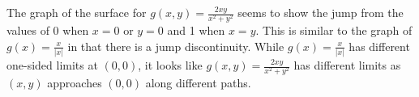 \begin{activitySolution}
\item The graph of the surface for $g(x,y) = \frac{2xy}{x^2+y^2}$ seems to show the jump from the values of 0 when $x=0$ or $y=0$ and 1 when $x=y$. This is similar to the graph of $g(x) = \frac{x}{|x|}$ in that there is a jump discontinuity. While $g(x) = \frac{x}{|x|}$ has different one-sided limits at $(0,0)$, it looks like $g(x,y) = \frac{2xy}{x^2+y^2}$ has different limits as $(x,y)$ approaches $(0,0)$ along different paths. 


      
    \ea


\end{activitySolution}

\afterpa 